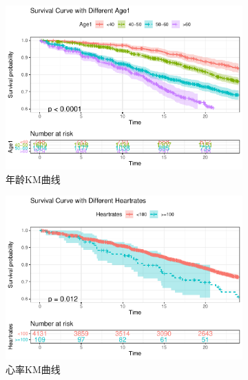 \documentclass[lang=cn,11pt,a4paper,cite=super,AutoFakeBold]{elegantpaper}
\begin{document}
\begin{figure}[!htbp]
   \begin{subfigure}[b]{0.49\textwidth}
     \centering
     \includegraphics[width=\linewidth]{img/km-1.pdf}  
   \caption{年龄KM曲线}
   \label{fig:km1}
   \end{subfigure}
   \begin{subfigure}[b]{0.49\textwidth}
     \centering
     \includegraphics[width=\linewidth]{img/km-2.pdf}  
     \caption{心率KM曲线}
     \label{fig:km2}
   \end{subfigure}
   ~
   \begin{subfigure}[b]{0.49\textwidth}
      \centering

\end{subfigure}
\end{figure}
\end{document}
